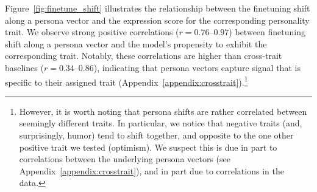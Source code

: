 Figure~\ref{fig:finetune_shift} illustrates the relationship between the finetuning shift along a persona vector and the expression score for the corresponding personality trait. We observe strong positive correlations ($r = 0.76\text{--}0.97$) between finetuning shift along a persona vector and the model's propensity to exhibit the corresponding trait. Notably, these correlations are higher than cross-trait baselines ($r = 0.34\text{--}0.86$), indicating that persona vectors capture signal that is specific to their assigned trait (Appendix~\ref{appendix:crosstrait}).\footnote{However, it is worth noting that persona shifts are rather correlated between seemingly different traits. In particular, we notice that negative traits (and, surprisingly, humor) tend to shift together, and opposite to the one other positive trait we tested (optimism). We suspect this is due in part to correlations between the underlying persona vectors (see Appendix~\ref{appendix:crosstrait}), and in part due to correlations in the data.}
